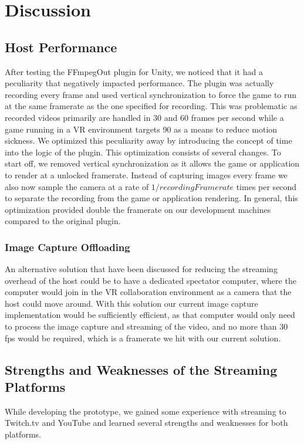 \section{Discussion}
\subsection{Host Performance}
After testing the FFmpegOut plugin for Unity, we noticed that it had a peculiarity that negatively impacted performance. The plugin was actually recording every frame and used vertical synchronization to force the game to run at the same framerate as the one specified for recording. This was problematic as recorded videos primarily are handled in 30 and 60 frames per second while a game running in a VR environment targets 90 as a means to reduce motion sickness. We optimized this peculiarity away by introducing the concept of time into the logic of the plugin. This optimization consists of several changes. To start off, we removed vertical synchronization as it allows the game or application to render at a unlocked framerate. Instead of capturing images every frame we also now sample the camera at a rate of $1/recordingFramerate$ times per second to separate the recording from the game or application rendering. In general, this optimization provided double the framerate on our development machines compared to the original plugin.  

\subsubsection{Image Capture Offloading}
An alternative solution that have been discussed for reducing the streaming overhead of the host could be to have a dedicated spectator computer, where the computer would join in the VR collaboration environment as a camera that the host could move around. With this solution our current image capture implementation would be sufficiently efficient, as that computer would only need to process the image capture and streaming of the video, and no more than 30 fps would be required, which is a framerate we hit with our current solution.
    
\subsection{Strengths and Weaknesses of the Streaming Platforms}
While developing the prototype, we gained some experience with streaming to Twitch.tv and YouTube and learned several strengths and weaknesses for both platforms.


